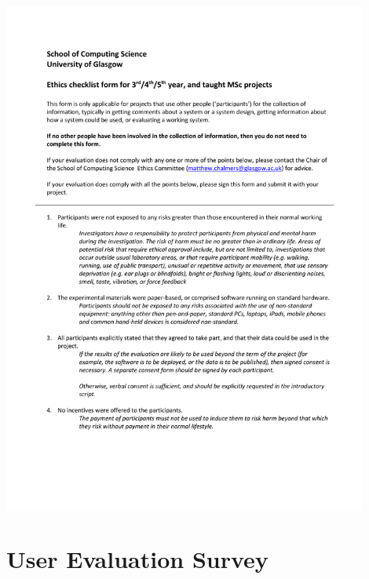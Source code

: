 \documentclass{l4proj}
\begin{document}
\begin{appendices}
\centerline{
\includegraphics[width=0.9\textwidth, pages={1}]{dissertation/appendices/2549880G_ethics_checklist.pdf}
}



\chapter{User Evaluation Survey}
\label{app: user eval survey}


\end{appendices}
\end{document}
